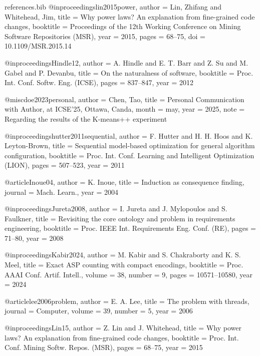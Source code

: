 \documentclass[runningheads]{llncs}
\begin{document}
\begin{filecontents}{references.bib}
@inproceedings{lin2015power,
  author = {Lin, Zhifang and Whitehead, Jim},
  title = {Why power laws? {A}n explanation from fine-grained code changes},
  booktitle = {Proceedings of the 12th Working Conference on Mining Software Repositories (MSR)},
  year = {2015},
  pages = {68--75},
  doi = {10.1109/MSR.2015.14}
}



@inproceedings{Hindle12,
  author    = {A. Hindle and E. T. Barr and Z. Su and M. Gabel and P. Devanbu},
  title     = {On the naturalness of software},
  booktitle = {Proc. Int. Conf. Softw. Eng. (ICSE)},
  pages     = {837--847},
  year      = {2012}
}

@misc{doe2023personal,
  author = {Chen, Tao},
  title = {Personal Communication with Author, at ICSE'25, Ottawa, Canda},
  month = may,
  year = {2025},
  note = {Regarding the results of the K-means++ experiment} 
}


@inproceedings{hutter2011sequential,
  author    = {F. Hutter and H. H. Hoos and K. Leyton-Brown},
  title     = {Sequential model-based optimization for general algorithm configuration},
  booktitle = {Proc. Int. Conf. Learning and Intelligent Optimization (LION)},
  pages     = {507--523},
  year      = {2011}
}

@article{Inoue04,
  author  = {K. Inoue},
  title   = {Induction as consequence finding},
  journal = {Mach. Learn.},
  year    = {2004}
}



@inproceedings{Jureta2008,
  author    = {I. Jureta and J. Mylopoulos and S. Faulkner},
  title     = {Revisiting the core ontology and problem in requirements engineering},
  booktitle = {Proc. IEEE Int. Requirements Eng. Conf. (RE)},
  pages     = {71--80},
  year      = {2008}
}


@inproceedings{Kabir2024,
  author    = {M. Kabir and S. Chakraborty and K. S. Meel},
  title     = {Exact ASP counting with compact encodings},
  booktitle = {Proc. AAAI Conf. Artif. Intell.},
  volume    = {38},
  number    = {9},
  pages     = {10571--10580},
  year      = {2024}
}



@article{lee2006problem,
 author  = {E. A. Lee},
  title   = {The problem with threads},
  journal = {Computer},
  volume  = {39},
  number  = {5},
  year = {2006}
}

@inproceedings{Lin15,
  author    = {Z. Lin and J. Whitehead},
  title     = {Why power laws? An explanation from fine-grained code changes},
  booktitle = {Proc. Int. Conf. Mining Softw. Repos. (MSR)},
  pages     = {68--75},
  year      = {2015}
}




\end{filecontents}
\end{document}

